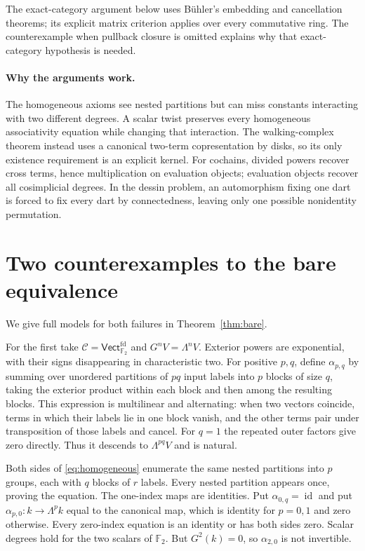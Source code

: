 \documentclass[11pt,a4paper]{article}
\theoremstyle{definition}
\newcommand{\id}{\operatorname{id}}
\newcommand{\F}{\mathbb F}
\begin{document}
The exact-category argument below uses B\"uhler's embedding and
cancellation theorems; its explicit matrix criterion applies over every
commutative ring. The counterexample when pullback closure is omitted
explains why that exact-category hypothesis is needed.

\paragraph{Why the arguments work.}
The homogeneous axioms see nested partitions but can miss constants interacting with two different degrees. A scalar twist preserves every homogeneous associativity equation while changing that interaction. The walking-complex theorem instead uses a canonical two-term copresentation by disks, so its only existence requirement is an explicit kernel. For cochains, divided powers recover cross terms, hence multiplication on evaluation objects; evaluation objects recover all cosimplicial degrees. In the dessin problem, an automorphism fixing one dart is forced to fix every dart by connectedness, leaving only one possible nonidentity permutation.

\section{Two counterexamples to the bare equivalence}
We give full models for both failures in Theorem~\ref{thm:bare}.

For the first take $\mathcal C=\mathsf{Vect}_{\F_2}^{\mathrm{fd}}$ and $G^nV=\Lambda^nV$. Exterior powers are exponential, with their signs disappearing in characteristic two. For positive $p,q$, define $\alpha_{p,q}$ by summing over unordered partitions of $pq$ input labels into $p$ blocks of size $q$, taking the exterior product within each block and then among the resulting blocks. This expression is multilinear and alternating: when two vectors coincide, terms in which their labels lie in one block vanish, and the other terms pair under transposition of those labels and cancel. For $q=1$ the repeated outer factors give zero directly. Thus it descends to $\Lambda^{pq}V$ and is natural.

Both sides of \eqref{eq:homogeneous} enumerate the same nested partitions into $p$ groups, each with $q$ blocks of $r$ labels. Every nested partition appears once, proving the equation. The one-index maps are identities. Put $\alpha_{0,q}=\id$ and put $\alpha_{p,0}:k\to\Lambda^pk$ equal to the canonical map, which is identity for $p=0,1$ and zero otherwise. Every zero-index equation is an identity or has both sides zero. Scalar degrees hold for the two scalars of $\F_2$. But $G^2(k)=0$, so $\alpha_{2,0}$ is not invertible.
\end{document}
